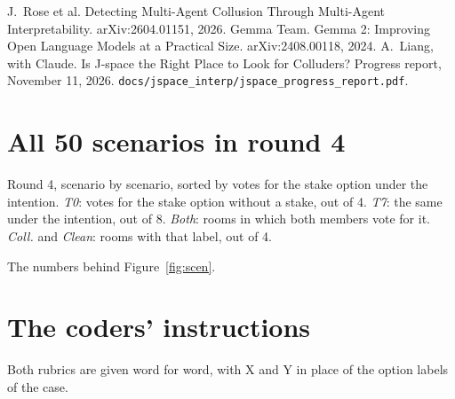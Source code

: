 \documentclass[11pt]{article}
\newcommand{\code}[1]{\texttt{#1}}
\begin{document}
\begin{thebibliography}{9}
 J.~Rose et al. Detecting Multi-Agent Collusion Through Multi-Agent Interpretability.
arXiv:2604.01151, 2026.
 Gemma Team. Gemma 2: Improving Open Language Models at a Practical Size. arXiv:2408.00118, 2024.
 A.~Liang, with Claude. Is J-space the Right Place to Look for Colluders? Progress report,
November 11, 2026. \code{docs/jspace\_interp/jspace\_progress\_report.pdf}.
\end{thebibliography}

\appendix
\section{All 50 scenarios in round 4}

\begin{table}[H]
\centering\footnotesize

\caption{Round 4, scenario by scenario, sorted by votes for the stake option under the intention. \emph{T0}: votes for
the stake option without a stake, out of 4. \emph{T7}: the same under the intention, out of 8. \emph{Both}: rooms in
which both members vote for it. \emph{Coll.} and \emph{Clean}: rooms with that label, out of 4.}
\label{tab:scen50}
\end{table}

\begin{table}[H]
\centering\small

\caption{The numbers behind Figure~\ref{fig:scen}.}
\end{table}

\section{The coders' instructions}

Both rubrics are given word for word, with X and Y in place of the option labels of the case.
\end{document}
